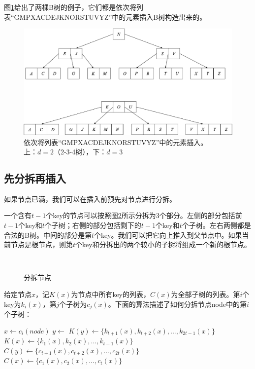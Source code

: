 \documentclass{ctexart}
\begin{document}
图\ref{fig:btree-insert-fp}给出了两棵B树的例子，它们都是依次将列表``GMPXACDEJKNORSTUVYZ''中的元素插入B树构造出来的。

\begin{figure}[htbp]
  \centering
  \includegraphics[scale=0.4]{img/btree-insert-fp.png}
  \captionsetup{justification=centering}
  \caption{依次将列表``GMPXACDEJKNORSTUVYZ''中的元素插入。\\
上：$d = 2$（2-3-4树），下：$d = 3$}
  \label{fig:btree-insert-fp}
\end{figure}

\subsection{先分拆再插入}

如果节点已满，我们可以在插入前预先对节点进行分拆。

一个含有$t-1$个key的节点可以按照图\ref{fig:node-split}所示分拆为3个部分。左侧的部分包括前$t-1$个key和$t$个子树；右侧的部分包括剩下的$t-1$个key和$t$个子树。左右两侧都是合法的B树。中间的部分是第$t$个key。我们可以把它向上推入到父节点中。如果当前节点是根节点，则第$t$个key和分拆出的两个较小的子树将组成一个新的根节点。

\begin{figure}[htbp]
  \centering
   \\
  \caption{分拆节点}
  \label{fig:node-split}
\end{figure}

给定节点$x$，记$K(x)$为节点中所有key的列表，$C(x)$为全部子树的列表。第$i$个key为$k_i(x)$，第$j$个子树为$c_j(x)$。下面的算法描述了如何分拆节点node中的第$i$个子树：

\begin{algorithmic}[1]
  \State $x \gets c_i(node)$
  \State $y \gets$ 
  \State {}
  \State {}
  \State $K(y) \gets \{k_{t+1}(x), k_{t+2}(x), ..., k_{2t-1}(x)\}$
  \State $K(x) \gets \{k_1(x), k_2(x), ..., k_{t-1}(x)\}$
    \State $C(y) \gets \{c_{t+1}(x), c_{t+2}(x), ..., c_{2t}(x)\}$
    \State $C(x) \gets \{c_1(x), c_2(x), ..., c_t(x)\}$
  \EndIf
\EndProcedure
\end{algorithmic}
\end{document}
